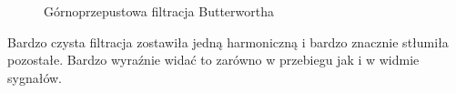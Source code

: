 \documentclass[12pt,titlepage]{report}
\begin{document}
\begin{figure}[!h]
	\centering
	\caption{Górnoprzepustowa filtracja Butterwortha}
\end{figure}
Bardzo czysta filtracja zostawiła jedną harmoniczną i bardzo znacznie stłumiła pozostałe. Bardzo wyraźnie widać to zarówno w przebiegu jak i w widmie sygnałów.
\newpage
\end{document}
